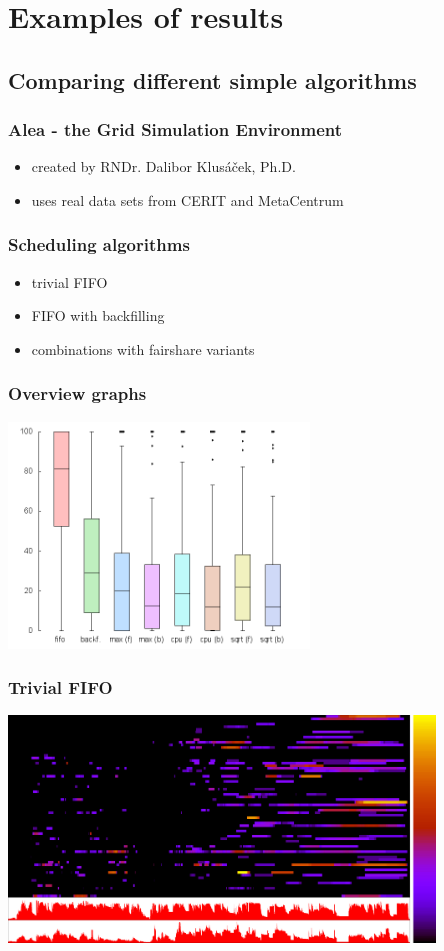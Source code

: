 \section{Examples of results}
\subsection{Comparing different simple algorithms}

\begin{frame}
	\frametitle{Alea - the Grid Simulation Environment}
	\begin{itemize}
		\item created by RNDr. Dalibor Klusáček, Ph.D.
		\item uses real data sets from CERIT and MetaCentrum
	\end{itemize}
\end{frame}

\begin{frame}
	\frametitle{Scheduling algorithms}
	\begin{itemize}
		\item trivial FIFO
		\item FIFO with backfilling
		\item combinations with fairshare variants
	\end{itemize}
\end{frame}

\begin{frame}
	\frametitle{Overview graphs}
	\begin{center}
	\includegraphics[width=0.6\textwidth]{perc_deadline.png}
	\end{center}
\end{frame}

\begin{frame}
	\frametitle{Trivial FIFO}
	\begin{center}
	\includegraphics[width=0.85\textwidth]{none_fifo.png}
	\end{center}
\end{frame}

